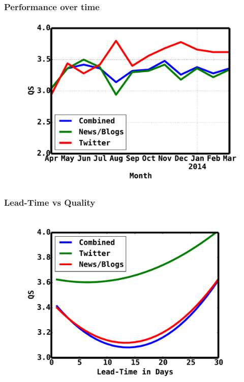 \documentclass[red,handout]{beamer}
\begin{document}
\begin{frame}
    \frametitle{Performance over time}
    \begin{figure}
        \includegraphics[scale=0.4]{monthlyqs}
    \end{figure}
\end{frame}

\begin{frame}
    \frametitle{Lead-Time vs Quality}
    \begin{figure}
        \includegraphics[scale=0.4]{leadTimeVsQS}
    \end{figure}
\end{frame}
\end{document}
